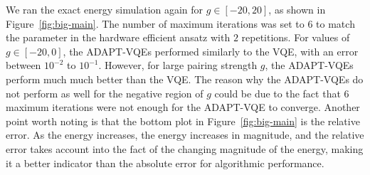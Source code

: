 We ran the exact energy simulation again for $ g \in [-20,20] $, as shown in Figure~\ref{fig:big-main}. The number of maximum iterations was set to $ 6 $ to match the parameter in the hardware efficient ansatz with $ 2 $ repetitions. For values of $ g \in [-20,0] $, the ADAPT-VQEs performed similarly to the VQE, with an error between $ 10^{-2} $ to $ 10^{-1} $. However, for large pairing strength $ g $, the ADAPT-VQEs perform much much better than the VQE. The reason why the ADAPT-VQEs do not perform as well for the negative region of $ g $ could be due to the fact that $ 6 $ maximum iterations were not enough for the ADAPT-VQE to converge. Another point worth noting is that the bottom plot in Figure~\ref{fig:big-main} is the relative error. As the energy increases, the energy increases in magnitude, and the relative error takes account into the fact of the changing magnitude of the energy, making it a better indicator than the absolute error for algorithmic performance. 

